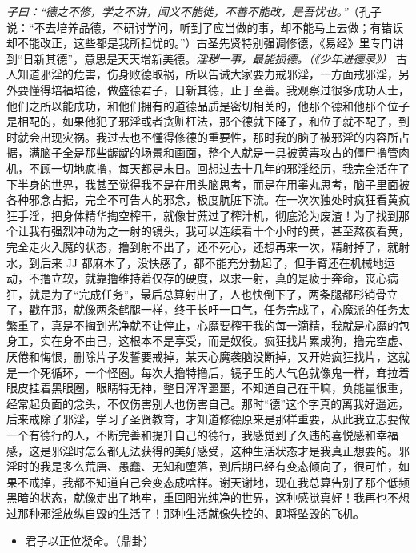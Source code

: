 \textit{子曰：“德之不修，学之不讲，闻义不能徙，不善不能改，是吾忧也。”}（孔子说：“不去培养品德，不研讨学问，听到了应当做的事，却不能马上去做；有错误却不能改正，这些都是我所担忧的。”）古圣先贤特别强调修德，《易经》里专门讲到“日新其德”，意思是天天增新美德。\textit{淫秽一事，最能损德。（《少年进德录》）} 古人知道邪淫的危害，伤身败德取祸，所以告诫大家要力戒邪淫，一方面戒邪淫，另外要懂得培福培德，做盛德君子，日新其德，止于至善。我观察过很多成功人士，他们之所以能成功，和他们拥有的道德品质是密切相关的，他那个德和他那个位子是相配的，如果他犯了邪淫或者贪赃枉法，那个德就下降了，和位子就不配了，到时就会出现灾祸。我过去也不懂得修德的重要性，那时我的脑子被邪淫的内容所占据，满脑子全是那些龌龊的场景和画面，整个人就是一具被黄毒攻占的僵尸撸管肉机，不顾一切地疯撸，每天都是末日。回想过去十几年的邪淫经历，我完全活在了下半身的世界，我甚至觉得我不是在用头脑思考，而是在用睾丸思考，脑子里面被各种邪念占据，完全不可告人的邪念，极度肮脏下流。在一次次独处时疯狂看黄疯狂手淫，把身体精华掏空榨干，就像甘蔗过了榨汁机，彻底沦为废渣！为了找到那个让我有强烈冲动为之一射的镜头，我可以连续看十个小时的黄，甚至熬夜看黄，完全走火入魔的状态，撸到射不出了，还不死心，还想再来一次，精射掉了，就射水，到后来 JJ 都麻木了，没快感了，都不能充分勃起了，但手臂还在机械地运动，不撸立软，就靠撸维持着仅存的硬度，以求一射，真的是疲于奔命，丧心病狂，就是为了“完成任务”，最后总算射出了，人也快倒下了，两条腿都形销骨立了，戳在那，就像两条鹤腿一样，终于长吁一口气，任务完成了，心魔派的任务太繁重了，真是不掏到光净就不让停止，心魔要榨干我的每一滴精，我就是心魔的包身工，实在身不由己，这根本不是享受，而是奴役。疯狂找片累成狗，撸完空虚、厌倦和悔恨，删除片子发誓要戒掉，某天心魔袭脑没断掉，又开始疯狂找片，这就是一个死循环，一个怪圈。每次大撸特撸后，镜子里的人气色就像鬼一样，耷拉着眼皮挂着黑眼圈，眼睛特无神，整日浑浑噩噩，不知道自己在干嘛，负能量很重，经常起负面的念头，不仅伤害别人也伤害自己。那时“德”这个字真的离我好遥远，后来戒除了邪淫，学习了圣贤教育，才知道修德原来是那样重要，从此我立志要做一个有德行的人，不断完善和提升自己的德行，我感觉到了久违的喜悦感和幸福感，这是邪淫时怎么都无法获得的美好感受，这种生活状态才是我真正想要的。邪淫时的我是多么荒唐、愚蠢、无知和堕落，到后期已经有变态倾向了，很可怕，如果不戒掉，我都不知道自己会变态成啥样。谢天谢地，现在我总算告别了那个低频黑暗的状态，就像走出了地牢，重回阳光纯净的世界，这种感觉真好！我再也不想过那种邪淫放纵自毁的生活了！那种生活就像失控的、即将坠毁的飞机。

\begin{itemize}\it
    \item 君子以正位凝命。（鼎卦）
\end{itemize}

